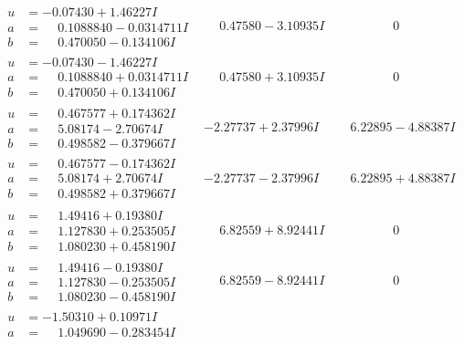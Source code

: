 \documentclass[1p]{elsarticle_modified}
\theoremstyle{definition}
\begin{document}
$$\begin{array}{c|c|c}
\begin{aligned}
u &= -0.07430 + 1.46227 I \\
a &= \phantom{-}0.1088840 - 0.0314711 I \\
b &= \phantom{-}0.470050 - 0.134106 I\end{aligned}
 & \phantom{-}0.47580 - 3.10935 I & \phantom{-0.000000 } 0 \\ \hline\begin{aligned}
u &= -0.07430 - 1.46227 I \\
a &= \phantom{-}0.1088840 + 0.0314711 I \\
b &= \phantom{-}0.470050 + 0.134106 I\end{aligned}
 & \phantom{-}0.47580 + 3.10935 I & \phantom{-0.000000 } 0 \\ \hline\begin{aligned}
u &= \phantom{-}0.467577 + 0.174362 I \\
a &= \phantom{-}5.08174 - 2.70674 I \\
b &= \phantom{-}0.498582 - 0.379667 I\end{aligned}
 & -2.27737 + 2.37996 I & \phantom{-}6.22895 - 4.88387 I \\ \hline\begin{aligned}
u &= \phantom{-}0.467577 - 0.174362 I \\
a &= \phantom{-}5.08174 + 2.70674 I \\
b &= \phantom{-}0.498582 + 0.379667 I\end{aligned}
 & -2.27737 - 2.37996 I & \phantom{-}6.22895 + 4.88387 I \\ \hline\begin{aligned}
u &= \phantom{-}1.49416 + 0.19380 I \\
a &= \phantom{-}1.127830 + 0.253505 I \\
b &= \phantom{-}1.080230 + 0.458190 I\end{aligned}
 & \phantom{-}6.82559 + 8.92441 I & \phantom{-0.000000 } 0 \\ \hline\begin{aligned}
u &= \phantom{-}1.49416 - 0.19380 I \\
a &= \phantom{-}1.127830 - 0.253505 I \\
b &= \phantom{-}1.080230 - 0.458190 I\end{aligned}
 & \phantom{-}6.82559 - 8.92441 I & \phantom{-0.000000 } 0 \\ \hline\begin{aligned}
u &= -1.50310 + 0.10971 I \\
a &= \phantom{-}1.049690 - 0.283454 I \\

\end{aligned}
\end{array}$$
\end{document}
